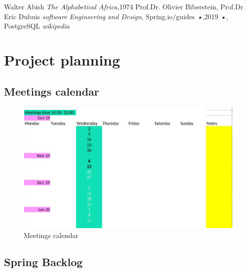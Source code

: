 \documentclass{scrartcl}
\begin{document}
\printbibliography[heading=bibintoc]


\begin{thebibliography}{books}
Walter Abish \emph{The Alphabetical Africa},1974
 Prof.Dr. Olivier Biberstein, Prof.Dr Eric Dubuis \emph{software Engineering and Design},
Spring.io/guides \emph{•},2019
 \emph{•},
 PostgreSQL \emph{wikipedia}
\end{thebibliography}


\section{Project planning}
\subsection{Meetings calendar}

\begin{figure}[H]
\centering
\includegraphics[width = 130mm]{agenda.jpg}
\caption{Meetings calendar}
\label{calendar}
\end{figure}

\subsection{Spring Backlog}
\end{document}
